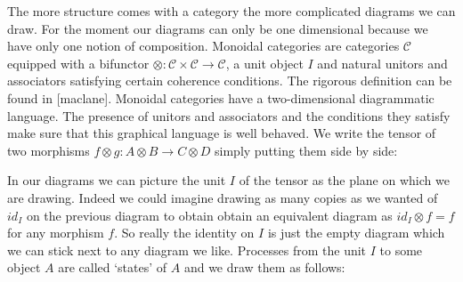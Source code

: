\documentclass{article}
\begin{document}
The more structure comes with a category the more complicated diagrams we can draw. For the moment our diagrams can only be one dimensional because we have only one notion of composition. Monoidal categories are categories $\mathcal{C}$ equipped with a bifunctor $\otimes : \mathcal{C} \times \mathcal{C} \rightarrow \mathcal{C}$, a unit object $I$ and natural unitors and associators satisfying certain coherence conditions. The rigorous definition can be found in [maclane]. Monoidal categories have a two-dimensional diagrammatic language. The presence of unitors and associators and the conditions they satisfy make sure that this graphical language is well behaved. We write the tensor of two morphisms $f \otimes g : A \otimes B \rightarrow C \otimes D$ simply putting them side by side:
\begin{center}
\end{center}
In our diagrams we can picture the unit $I$ of the tensor as the plane on which we are drawing. Indeed we could imagine drawing as many copies as we wanted of $id_I$ on the previous diagram to obtain obtain an equivalent diagram as $id_I \otimes f = f$ for any morphism $f$. So really the identity on $I$ is just the empty diagram which we can stick next to any diagram we like. Processes from the unit $I$ to some object $A$ are called `states' of $A$ and we draw them as follows:
\begin{center}
\end{center}
\end{document}
